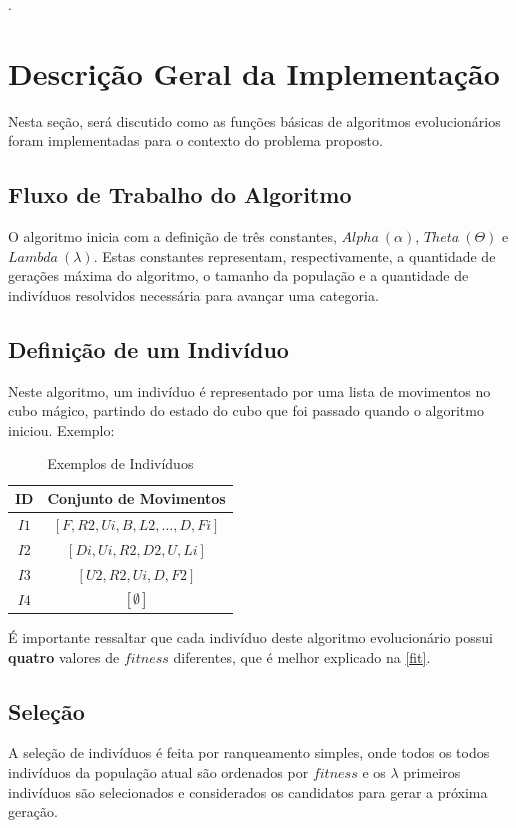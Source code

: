\documentclass[12pt]{article}
\begin{document}
  \cite{thistlethwaiteES}.

\section{Descrição Geral da Implementação}
  Nesta seção, será discutido como as funções básicas de algoritmos evolucionários foram implementadas para o contexto do problema proposto.

  \subsection{Fluxo de Trabalho do Algoritmo}
    O algoritmo inicia com a definição de três constantes, $Alpha\ (\alpha)$, $Theta\ (\Theta)$ e $Lambda\ (\lambda)$. Estas constantes representam, respectivamente, a quantidade de gerações máxima do algoritmo, o tamanho da população e a quantidade de indivíduos resolvidos necessária para avançar uma categoria.

  \subsection{Definição de um Indivíduo}
    Neste algoritmo, um indivíduo é representado por uma lista de movimentos no cubo mágico, partindo do estado do cubo que foi passado quando o algoritmo iniciou. Exemplo:

      \begin{table}[ht]
      \centering
      \caption{Exemplos de Indivíduos}
      \begin{tabular}{|c|c|}
        \hline
        \textbf{ID} & \textbf{Conjunto de Movimentos}             \\ \hline
            $I1$             &  $[F, R2, Ui, B, L2,\dots, D, Fi]$ \\ \hline
            $I2$             &  $[Di, Ui, R2, D2, U, Li]$         \\ \hline
            $I3$             &  $[U2, R2, Ui, D, F2]$             \\ \hline
            $I4$             &  $[\emptyset]$                     \\ \hline
      \end{tabular}
      \end{table}

    É importante ressaltar que cada indivíduo deste algoritmo evolucionário possui \textbf{quatro} valores de $fitness$ diferentes, que é melhor explicado na \autoref{fit}.

 
  \subsection{Seleção}
    A seleção de indivíduos é feita por ranqueamento simples, onde todos os todos indivíduos da população atual são ordenados por $fitness$ e os $\lambda$ primeiros indivíduos
    são selecionados e considerados os candidatos para gerar a próxima geração.
\end{document}
